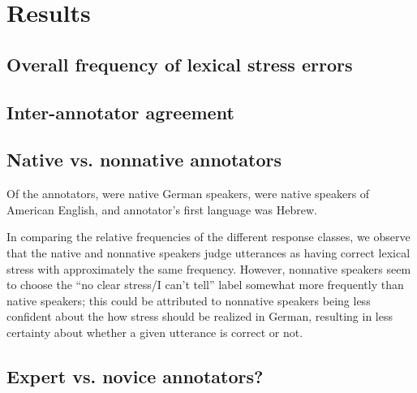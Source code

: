 	\section{Results}
	\label{sec:lexstress:results}	
	
	
	
		\subsection{Overall frequency of lexical stress errors}
		\label{sec:results:overall}
		
		
		\subsection{Inter-annotator agreement}
		\label{sec:results:agreement}
		
		\TODO{}
	
	
		\subsection{Native vs. nonnative annotators}
		\label{sec:results:native}
		
		Of the  annotators,  were native German speakers,  were native speakers of American English, and  annotator's first language was Hebrew. 

		In comparing the relative frequencies of the different response classes, we observe that the native and nonnative speakers judge utterances as having correct lexical stress with approximately the same frequency. However, nonnative speakers seem to choose the ``no clear stress/I can't tell'' label somewhat more frequently than native speakers; this could be attributed to nonnative speakers being less confident about the how stress should be realized in German, resulting in less certainty about whether a given utterance is correct or not. 
		
		\subsection{Expert vs. novice annotators?}
		\label{sec:results:expert}
		
